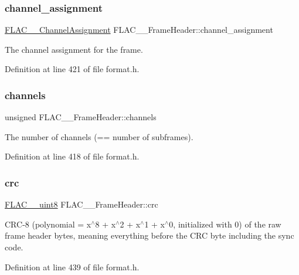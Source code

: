 \subsubsection{\texorpdfstring{channel\_assignment}{channel\_assignment}}
{\footnotesize\ttfamily \mbox{\hyperlink{group__flac__format_ga79855f8525672e37f299bbe02952ef9c}{F\+L\+A\+C\+\_\+\+\_\+\+Channel\+Assignment}} F\+L\+A\+C\+\_\+\+\_\+\+Frame\+Header\+::channel\+\_\+assignment}

The channel assignment for the frame. 

Definition at line 421 of file format.\+h.

\mbox{\label{struct_f_l_a_c_____frame_header_a5950c6e4f03ad81f4a03c8c6188b9bf5}} 
\subsubsection{\texorpdfstring{channels}{channels}}
{\footnotesize\ttfamily unsigned F\+L\+A\+C\+\_\+\+\_\+\+Frame\+Header\+::channels}

The number of channels (== number of subframes). 

Definition at line 418 of file format.\+h.

\mbox{\label{struct_f_l_a_c_____frame_header_a980438c380697df6f332cb27dc4672c4}} 
\subsubsection{\texorpdfstring{crc}{crc}}
{\footnotesize\ttfamily \mbox{\hyperlink{ordinals_8h_ac49472999bc6507b4ded92a922168adf}{F\+L\+A\+C\+\_\+\+\_\+uint8}} F\+L\+A\+C\+\_\+\+\_\+\+Frame\+Header\+::crc}

C\+R\+C-\/8 (polynomial = x$^\wedge$8 + x$^\wedge$2 + x$^\wedge$1 + x$^\wedge$0, initialized with 0) of the raw frame header bytes, meaning everything before the C\+RC byte including the sync code. 

Definition at line 439 of file format.\+h.

\mbox{\label{struct_f_l_a_c_____frame_header_aa8f183fd8bcb5b73c392ae9ba7da4dbb}} 
